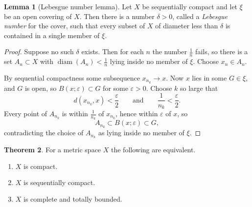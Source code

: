 \documentclass[11pt,a4paper]{article}
\theoremstyle{definition}
\newtheorem{thm}{Theorem}[section]
\newtheorem{lem}[thm]{Lemma}
\DeclareMathOperator{\diam}{diam}
\begin{document}
\begin{lem}[Lebesgue number lemma]
Let $X$ be sequentially compact and let $\xi$ be an open covering of $X$. Then
there is a number $\delta>0$, called a \emph{Lebesgue number} for the cover,
such that every subset of $X$ of diameter less than $\delta$ is contained in a
single member of $\xi$.
\end{lem}

\begin{proof}
Suppose no such $\delta$ exists. Then for each $n$ the number $\frac1n$ fails,
so there is a set $A_n\subset X$ with $\diam(A_n)<\frac1n$ lying inside no
member of $\xi$. Choose $x_n\in A_n$.

By sequential compactness some subsequence $x_{n_k}\rightarrow x$. Now $x$ lies
in some $G\in\xi$, and $G$ is open, so $B(x;\varepsilon)\subset G$ for some
$\varepsilon>0$. Choose $k$ so large that
$$d(x_{n_k},x)<\frac{\varepsilon}{2}\qquad\text{and}\qquad
\frac{1}{n_k}<\frac{\varepsilon}{2}.$$
Every point of $A_{n_k}$ is within $\frac{1}{n_k}$ of $x_{n_k}$, hence within
$\varepsilon$ of $x$, so
$$A_{n_k}\subset B(x;\varepsilon)\subset G ,$$
contradicting the choice of $A_{n_k}$ as lying inside no member of $\xi$.
\end{proof}

\begin{thm}
For a metric space $X$ the following are equivalent.
\begin{enumerate}
\item[(i)] $X$ is compact.
\item[(ii)] $X$ is sequentially compact.
\item[(iii)] $X$ is complete and totally bounded.
\end{enumerate}
\end{thm}
\end{document}
